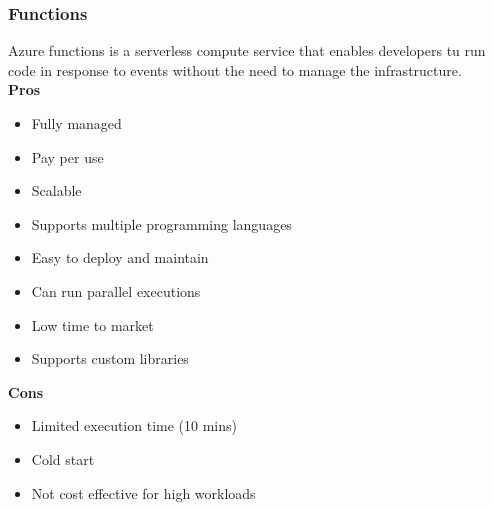         \subsubsection{Functions}
        \label{azure:functions}
        Azure functions is a serverless compute service that enables developers tu run code in response to 
        events without the need to manage the infrastructure.\\
        \textbf{Pros}
        \begin{itemize}
            \item Fully managed
            \item Pay per use
            \item Scalable
            \item Supports multiple programming languages
            \item Easy to deploy and maintain
            \item Can run parallel executions
            \item Low time to market
            \item Supports custom libraries
        \end{itemize}
        \textbf{Cons}
        \begin{itemize}
            \item Limited execution time (10 mins)
            \item Cold start
            \item Not cost effective for high workloads
        \end{itemize}

